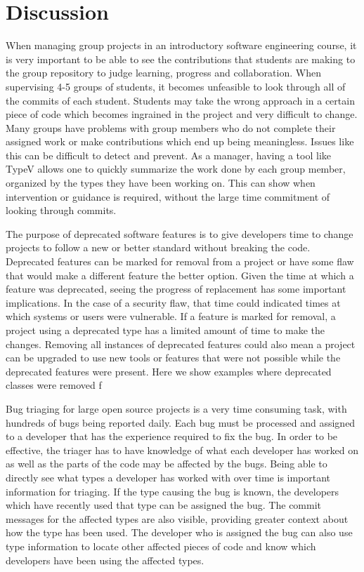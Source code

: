 \section{Discussion}

When managing group projects in an introductory software engineering course, it is very important to be able to see the contributions that students are making to the group repository to judge learning, progress and collaboration. When supervising 4-5 groups of students, it becomes unfeasible to look through all of the commits of each student. Students may take the wrong approach in a certain piece of code which becomes ingrained in the project and very difficult to change. Many groups have problems with group members who do not complete their assigned work or make contributions which end up being meaningless. Issues like this can be difficult to detect and prevent. As a manager, having a tool like TypeV allows one to quickly summarize the work done by each group member, organized by the types they have been working on. This can show when intervention or guidance is required, without the large time commitment of looking through commits.

The purpose of deprecated software features is to give developers time to change projects to follow a new or better standard without breaking the code. Deprecated features can be marked for removal from a project or have some flaw that would make a different feature the better option. Given the time at which a feature was deprecated, seeing the progress of replacement has some important implications. In the case of a security flaw, that time could indicated times at which systems or users were vulnerable. If a feature is marked for removal, a project using a deprecated type has a limited amount of time to make the changes. Removing all instances of deprecated features could also mean a project can be upgraded to use new tools or features that were not possible while the deprecated features were present.  Here we show examples where deprecated classes were removed f

Bug triaging for large open source projects is a very time consuming task, with hundreds  of bugs being reported daily. Each bug must be processed and assigned to a developer that has the experience required to fix the bug. In order to be effective, the triager has to have knowledge of what each developer has worked on as well as the parts of the code may be affected by the bugs. Being able to directly see what types a developer has worked with over time is important information for triaging. If the type causing the bug is known, the developers which have recently used that type can be assigned the bug. The commit messages for the affected types are also visible, providing greater context about how the type has been used. The developer who is assigned the bug can also use type information to locate other affected pieces of code and know which developers have been using the affected types.


